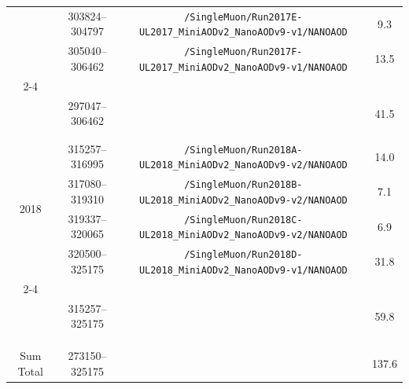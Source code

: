 \begin{table}[hbpt]
\begin{center}
{\begin{tabular}{cccc}
 & 303824--304797 & \texttt{/SingleMuon/Run2017E-UL2017\_MiniAODv2\_NanoAODv9-v1/NANOAOD} & 9.3 \\
 & 305040--306462 & \texttt{/SingleMuon/Run2017F-UL2017\_MiniAODv2\_NanoAODv9-v1/NANOAOD} & 13.5 \\
\cline{2-4} \\
 & 297047--306462 & & 41.5 \\ \\
\hline \\
\multirow{4}{*}{2018} & 315257--316995 & \texttt{/SingleMuon/Run2018A-UL2018\_MiniAODv2\_NanoAODv9-v2/NANOAOD} & 14.0 \\
 & 317080--319310 & \texttt{/SingleMuon/Run2018B-UL2018\_MiniAODv2\_NanoAODv9-v2/NANOAOD} & 7.1 \\
 & 319337--320065 & \texttt{/SingleMuon/Run2018C-UL2018\_MiniAODv2\_NanoAODv9-v2/NANOAOD} & 6.9 \\
 & 320500--325175 & \texttt{/SingleMuon/Run2018D-UL2018\_MiniAODv2\_NanoAODv9-v1/NANOAOD} & 31.8 \\
\cline{2-4} \\
 & 315257--325175 & & 59.8 \\ \\
\hline \\
\hline \hline \\
 Sum Total & 273150--325175 & & 137.6 \\
\end{tabular}}
\end{center}
\end{table}